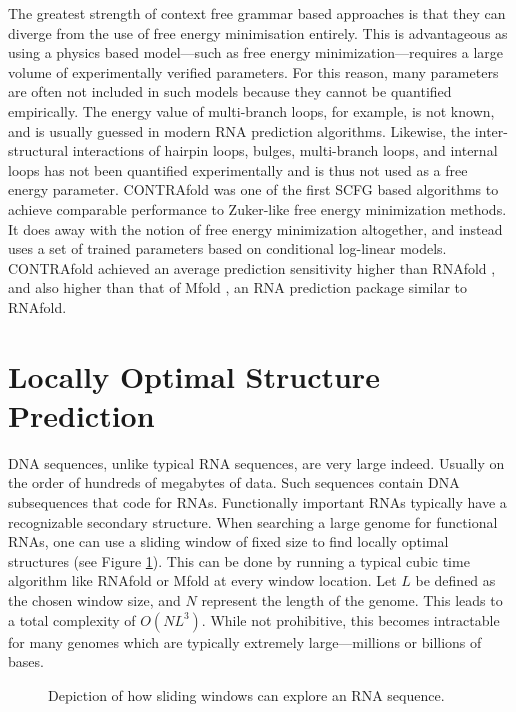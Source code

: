 \documentclass{cshonours}
\begin{document}
The greatest strength of context free grammar based approaches is that they
can diverge from the use of free energy minimisation entirely. This is advantageous as using
a physics based model---such as free energy minimization---requires a large volume
of experimentally verified parameters. For this reason, many parameters are often not included in such models because they cannot be quantified empirically.
The energy value of multi-branch loops, for example, is not known, and is usually
guessed in modern RNA prediction algorithms. Likewise, the inter-structural
interactions of hairpin loops, bulges, multi-branch loops, and internal loops has
not been quantified experimentally and is thus not used as a free energy parameter. CONTRAfold \cite{do2006contrafold} was one of the first SCFG based algorithms to achieve
comparable performance to Zuker-like free energy minimization methods. It does
away with the notion of free energy minimization altogether, and instead uses a
set of trained parameters based on conditional log-linear models. CONTRAfold
achieved an average prediction sensitivity higher than RNAfold \cite{lorenz2011viennarna}, and also higher
than that of Mfold \cite{zuker2003mfold}, an RNA prediction package similar to RNAfold.

\section{Locally Optimal Structure Prediction}
\label{sec:locopt}


DNA sequences, unlike typical RNA sequences, are very large indeed. Usually
on the order of hundreds of megabytes of data. Such sequences contain DNA
subsequences that code for RNAs. Functionally important RNAs typically have
a recognizable secondary structure. When searching a large genome for functional RNAs, one can use a sliding window of fixed size to find locally optimal
structures (see Figure \ref{fig:slidingwindow}). This can be done by running a typical cubic time algorithm like
RNAfold or Mfold at every window location. Let $L$ be defined as the chosen
window size, and $N$ represent the length of the genome. This leads to a total complexity of $O(NL^3)$. While not prohibitive, this becomes intractable for many
genomes which are typically extremely large---millions or billions of bases. 


\begin{figure}
\begin{center}
\end{center}
\caption{Depiction of how sliding windows can explore an RNA sequence.}
\label{fig:slidingwindow}
\end{figure}
\end{document}
